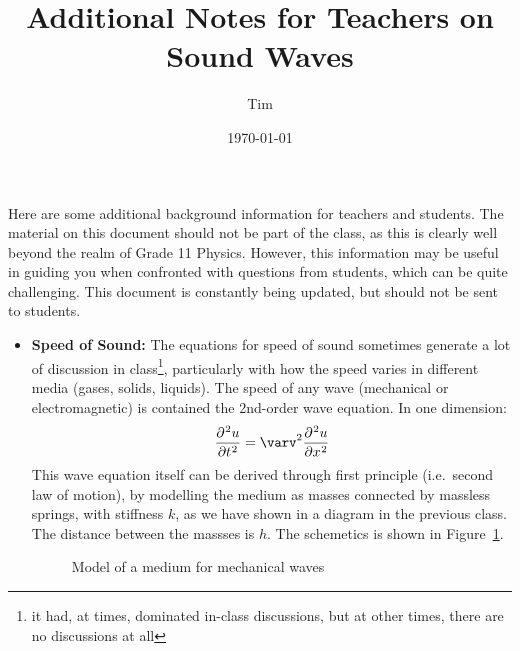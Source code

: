 \documentclass{../../oss-handout}
\title{Additional Notes for Teachers on Sound Waves}
\author{Tim}
\date{\today}
\begin{document}
\thispagestyle{title}
\gentitle

Here are some additional background information for teachers and students. The
material on this document should not be part of the class, as this is clearly
well beyond the realm of Grade 11 Physics. However, this information may be
useful in guiding you when confronted with questions from students, which can
be quite challenging. This document is constantly being updated, but should not
be sent to students.
\begin{itemize}[leftmargin=10pt]
\item\textbf{Speed of Sound:} The equations for speed of sound sometimes
  generate a lot of discussion in class\footnote{it had, at times, dominated
  in-class discussions, but at other times, there are no discussions at all},
  particularly with how the speed varies in different media (gases, solids,
  liquids). The speed of any wave (mechanical or electromagnetic) is contained
  the 2nd-order wave equation. In one dimension:
  \begin{equation}
    \diffp[2]ut=\varv^2\diffp[2]ux
  \end{equation}
  This wave equation itself can be derived through first principle (i.e.\
  second law of motion), by modelling the medium as masses connected by
  massless springs, with stiffness $k$, as we have shown in a diagram in the
  previous class. The distance between the massses is $h$. The schemetics is
  shown in Figure~\ref{medium}.
  \begin{figure}[ht]
    \centering
    \caption{Model of a medium for mechanical waves}
    \label{medium}
  \end{figure}
  

\end{itemize}
\end{document}
